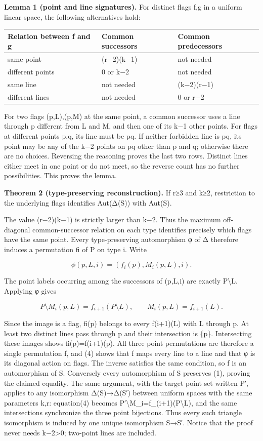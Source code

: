 \textbf{Lemma 1 (point and line signatures).} For distinct flags f,g in
a uniform linear space, the following alternatives hold:

{\def\LTcaptype{none} %
\begin{longtable}[]{@{}lll@{}}
\toprule\noalign{}
Relation between f and g & Common successors & Common predecessors \\
\midrule\noalign{}
\endhead
\bottomrule\noalign{}
\endlastfoot
same point & (r−2)(k−1) & not needed \\
different points & 0 or k−2 & not needed \\
same line & not needed & (k−2)(r−1) \\
different lines & not needed & 0 or r−2 \\
\end{longtable}
}

For two flags (p,L),(p,M) at the same point, a common successor uses a
line through p different from L and M, and then one of its k−1 other
points. For flags at different points p,q, its line must be pq. If
neither forbidden line is pq, its point may be any of the k−2 points on
pq other than p and q; otherwise there are no choices. Reversing the
reasoning proves the last two rows. Distinct lines either meet in one
point or do not meet, so the reverse count has no further possibilities.
This proves the lemma.

\textbf{Theorem 2 (type-preserving reconstruction).} If r≥3 and k≥2,
restriction to the underlying flags identifies Aut(Δ(S)) with Aut(S).

The value (r−2)(k−1) is strictly larger than k−2. Thus the maximum
off-diagonal common-successor relation on each type identifies precisely
which flags have the same point. Every type-preserving automorphism φ of
Δ therefore induces a permutation fi of P on type i. Write

\[
 \phi(p,L,i)=(f_i(p),M_i(p,L),i).
\]

The point labels occurring among the successors of (p,L,i) are exactly
P\textbackslash L. Applying φ gives

\[
 P\setminus M_i(p,L)=f_{i+1}(P\setminus L),
 \qquad M_i(p,L)=f_{i+1}(L).
\tag{4}
\]

Since the image is a flag, fi(p) belongs to every f(i+1)(L) with L
through p. At least two distinct lines pass through p and their
intersection is \{p\}. Intersecting these images shows fi(p)=f(i+1)(p).
All three point permutations are therefore a single permutation f, and
(4) shows that f maps every line to a line and that φ is its diagonal
action on flags. The inverse satisfies the same condition, so f is an
automorphism of S. Conversely every automorphism of S preserves (1),
proving the claimed equality. The same argument, with the target point
set written P′, applies to any isomorphism Δ(S)→Δ(S′) between uniform
spaces with the same parameters k,r: equation(4) becomes
P′\textbackslash M\_i=f\_(i+1)(P\textbackslash L), and the same
intersections synchronize the three point bijections. Thus every such
triangle isomorphism is induced by one unique isomorphism S→S′. Notice
that the proof never needs k−2\textgreater0; two-point lines are
included.

